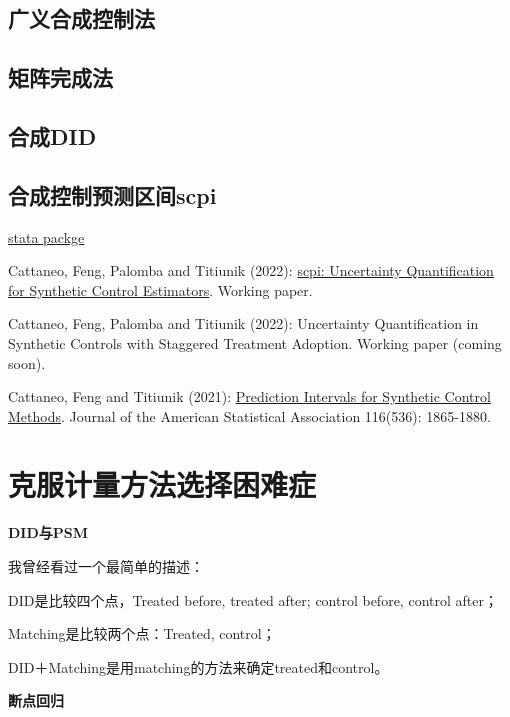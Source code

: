 \documentclass[cn,12pt,math=newtx,citestyle=gb7714-2015,bibstyle=gb7714-2015]{elegantbook}
\begin{document}
	\subsection{广义合成控制法}
	
	
	
	\subsection{矩阵完成法}
		
		
		
		
	\subsection{合成DID}
	
	
	
	
	\subsection{合成控制预测区间scpi}
	
	\href{https://nppackages.github.io/scpi/}{stata packge}
	
	Cattaneo, Feng, Palomba and Titiunik (2022): \href{https://nppackages.github.io/references/Cattaneo-Feng-Palomba-Titiunik_2022_scpi.pdf}{scpi: Uncertainty Quantification for Synthetic Control Estimators}.
	Working paper.

	Cattaneo, Feng, Palomba and Titiunik (2022): Uncertainty Quantification in Synthetic Controls with Staggered Treatment Adoption. Working paper (coming soon).
	
	Cattaneo, Feng and Titiunik (2021): \href{https://nppackages.github.io/references/Cattaneo-Feng-Titiunik_2021_JASA.pdf}{Prediction Intervals for Synthetic Control Methods}.
	Journal of the American Statistical Association 116(536): 1865-1880.
	
	
	\section{克服计量方法选择困难症}
	\textbf{DID与PSM}
	
	我曾经看过一个最简单的描述：
	
	DID是比较四个点，Treated before, treated after; control before, control after；
	
	Matching是比较两个点：Treated, control；
	
	DID＋Matching是用matching的方法来确定treated和control。
	
	
	\textbf{断点回归}
	
\end{document}

